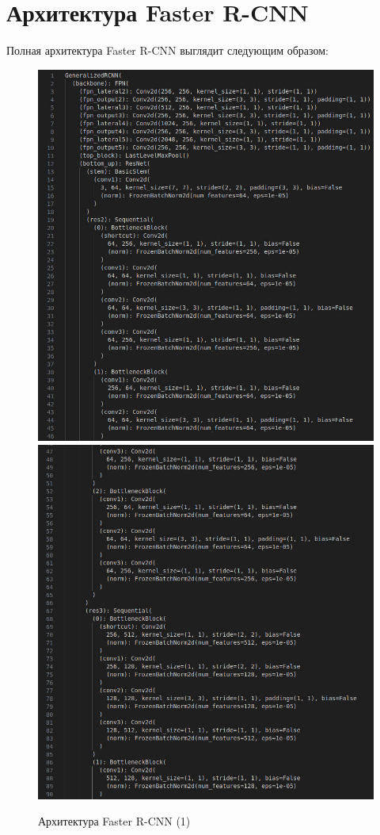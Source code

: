 \chapter{Архитектура Faster R-CNN} \label{appendix1}							%

Полная архитектура Faster R-CNN выглядит следующим образом:

\begin{figure}
	\includegraphics [scale=0.3]{my_folder/images/arch1}
	\includegraphics [scale=0.3]{my_folder/images/arch2}
	\label{fig:arch12}
	\caption{Архитектура Faster R-CNN (1)}
\end{figure}
